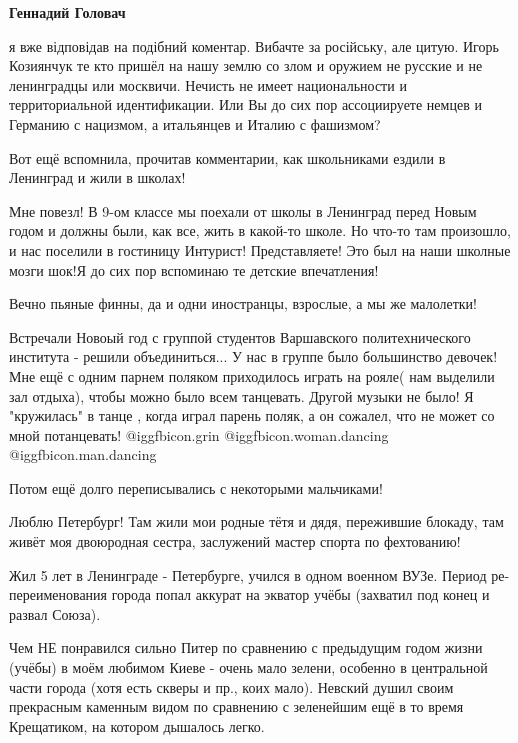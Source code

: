 \begin{itemize}
\begin{itemize}
\textbf{Геннадий Головач} 

я вже відповідав на подібний коментар. Вибачте за російську, але цитую. Игорь
Козиянчук те кто пришёл на нашу землю со злом и оружием не русские и не
ленинградцы или москвичи. Нечисть не имеет национальности и территориальной
идентификации. Или Вы до сих пор ассоциируете немцев и Германию с нацизмом, а
итальянцев и Италию с фашизмом?

\end{itemize} %


Вот ещё вспомнила, прочитав комментарии, как школьниками ездили в Ленинград и жили в школах!

Мне повезл! В 9-ом классе мы поехали от школы в Ленинград перед Новым годом и
должны были, как все, жить в какой-то школе. Но что-то там произошло, и нас
поселили в гостиницу Интурист! Представляете! Это был на наши школные мозги
шок!Я до сих пор вспоминаю те детские впечатления!

Вечно пьяные финны, да и одни иностранцы, взрослые, а мы же малолетки!

Встречали Новоый год с группой студентов Варшавского политехнического института
- решили объединиться... У нас в группе было большинство девочек! Мне ещё с
одним парнем поляком приходилось играть на рояле( нам выделили зал отдыха),
чтобы можно было всем танцевать. Другой музыки не было! Я "кружилась" в танце ,
когда играл парень поляк, а он сожалел, что не может со мной потанцевать!
 @igg{fbicon.grin}  @igg{fbicon.woman.dancing}  @igg{fbicon.man.dancing} 

Потом ещё долго переписывались с некоторыми мальчиками!


Люблю Петербург! Там жили мои родные тётя и дядя, пережившие блокаду, там живёт
моя двоюродная сестра, заслужений мастер спорта по фехтованию!


Жил 5 лет в Ленинграде - Петербурге, учился в одном военном ВУЗе. Период
ре-переименования города попал аккурат на экватор учёбы (захватил под конец и
развал Союза).

Чем НЕ понравился сильно Питер по сравнению с предыдущим годом жизни (учёбы) в
моём любимом Киеве - очень мало зелени, особенно в центральной части города
(хотя есть скверы и пр., коих мало). Невский душил своим прекрасным каменным
видом по сравнению с зеленейшим ещё в то время Крещатиком, на котором дышалось
легко.


\end{itemize}
